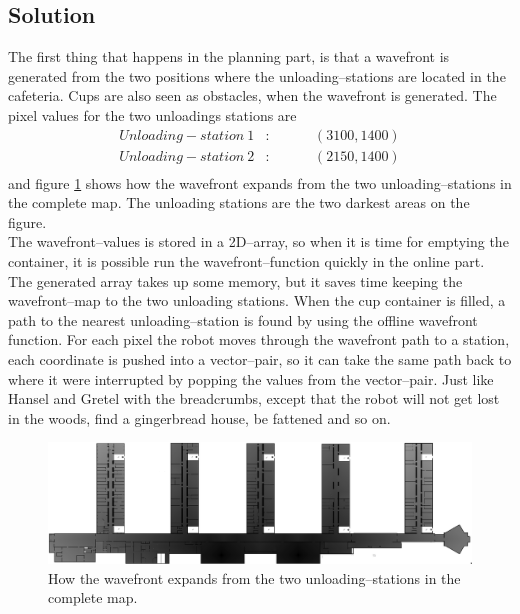 \subsection{Solution}
The first thing that happens in the planning part, is that a wavefront is generated from the two positions where the unloading--stations are located in the cafeteria. Cups are also seen as obstacles, when the wavefront is generated. The pixel values for the two unloadings stations are 
\begin{eqnarray*}
Unloading-station\: 1&:& \hspace{1cm}(3100,1400) \\
Unloading-station\: 2&:& \hspace{1cm}(2150,1400) \\
\end{eqnarray*}
and figure \ref{fig::path} shows how the wavefront expands from the two unloading--stations in the complete map. The unloading stations are the two darkest areas on the figure.\\[.2cm]
The wavefront--values is stored in a 2D--array, so when it is time for emptying the container, it is possible run the wavefront--function quickly in the online part. The generated array takes up some memory, but it saves time keeping the wavefront--map to the two unloading stations. When the cup container is filled, a path to the nearest unloading--station is found by using the offline wavefront function. For each pixel the robot moves through the wavefront path to a station, each coordinate is pushed into a vector--pair, so it can take the same path back to where it were interrupted by popping the values from the vector--pair. Just like Hansel and Gretel with the breadcrumbs, except that the robot will not get lost in the woods, find a gingerbread house, be fattened and so on.  

\begin{figure}[H]
\centering
\includegraphics[scale=0.33]{img/wavefront_path.png}
\caption{How the wavefront expands from the two unloading--stations in the complete map.}
\label{fig::path}
\end{figure}

